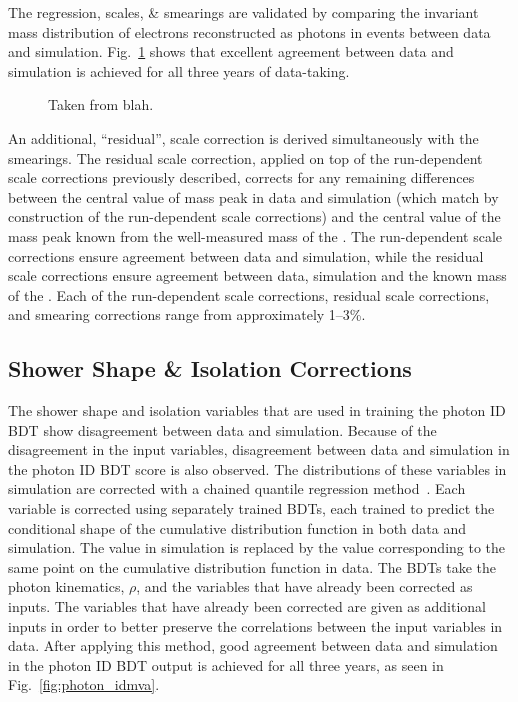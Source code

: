 The regression, scales, \& smearings are validated by comparing the invariant mass distribution of electrons reconstructed as photons in \Zee events between data and simulation.
Fig.~\ref{fig:photon_energy_validation} shows that excellent agreement between data and simulation is achieved for all three years of data-taking.
\begin{figure} [h!]
    \centering
    \caption{Taken from blah.}
    \label{fig:photon_energy_validation}
\end{figure}
An additional, ``residual'', scale correction is derived simultaneously with the smearings.
The residual scale correction, applied on top of the run-dependent scale corrections previously described, corrects for any remaining differences between the central value of \PZ mass peak in data and simulation (which match by construction of the run-dependent scale corrections) and the central value of the \PZ mass peak known from the well-measured mass of the \PZ.
The run-dependent scale corrections ensure agreement between data and simulation, while the residual scale corrections ensure agreement between data, simulation and the known mass of the \PZ.
Each of the run-dependent scale corrections, residual scale corrections, and smearing corrections range from approximately 1--3\%.

\subsection{Shower Shape \& Isolation Corrections} \label{sec:evt_photon_ss}
The shower shape and isolation variables that are used in training the photon ID BDT show disagreement between data and simulation.
Because of the disagreement in the input variables, disagreement between data and simulation in the photon ID BDT score is also observed.
The distributions of these variables in simulation are corrected with a chained quantile regression method~\cite{DBLP:journals/corr/abs-1211-6581}.
Each variable is corrected using separately trained BDTs, each trained to predict the conditional shape of the cumulative distribution function in both data and simulation.
The value in simulation is replaced by the value corresponding to the same point on the cumulative distribution function in data.
The BDTs take the photon kinematics, $\rho$, and the variables that have already been corrected as inputs.
The variables that have already been corrected are given as additional inputs in order to better preserve the correlations between the input variables in data.
After applying this method, good agreement between data and simulation in the photon ID BDT output is achieved for all three years, as seen in Fig.~\ref{fig:photon_idmva}.

